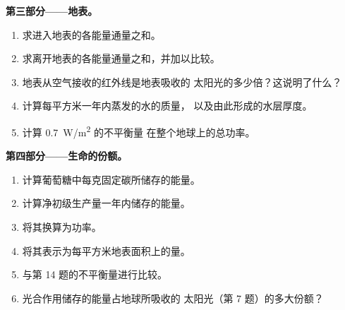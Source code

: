\begin{problem}
\medskip
\noindent\textbf{第三部分——地表。}
\begin{enumerate}[resume]
  \item 求进入地表的各能量通量之和。
  \item 求离开地表的各能量通量之和，并加以比较。
  \item 地表从空气接收的红外线是地表吸收的
        太阳光的多少倍？这说明了什么？
  \item 计算每平方米一年内蒸发的水的质量，
        以及由此形成的水层厚度。
  \item 计算 \qty{0.7}{W/m^2} 的不平衡量
        在整个地球上的总功率。
\end{enumerate}

\medskip
\noindent\textbf{第四部分——生命的份额。}
\begin{enumerate}[resume]
  \item 计算葡萄糖中每克固定碳所储存的能量。
  \item 计算净初级生产量一年内储存的能量。
  \item 将其换算为功率。
  \item 将其表示为每平方米地表面积上的量。
  \item 与第 14 题的不平衡量进行比较。
  \item 光合作用储存的能量占地球所吸收的
        太阳光（第 7 题）的多大份额？
\end{enumerate}
\end{problem}
